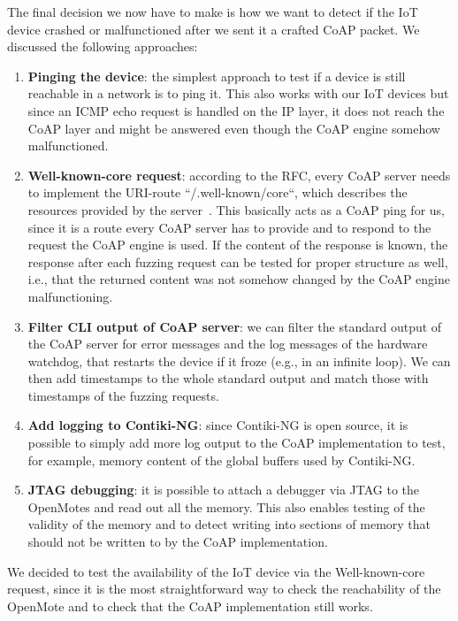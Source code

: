 The final decision we now have to make is how we want to detect if the IoT device crashed or malfunctioned after we sent it a crafted CoAP packet. We discussed the following approaches:
\begin{enumerate}
	\item \textbf{Pinging the device}: the simplest approach to test if a device is still reachable in a network is to ping it. This also works with our IoT devices but since an ICMP echo request is handled on the IP layer, it does not reach the CoAP layer and might be answered even though the CoAP engine somehow malfunctioned.
	\item \textbf{Well-known-core request}: according to the RFC, every CoAP server needs to implement the URI-route ``/.well-known/core``, which describes the resources provided by the server~\cite{RFC7252}. This basically acts as a CoAP ping for us, since it is a route every CoAP server has to provide and to respond to the request the CoAP engine is used. If the content of the response is known, the response after each fuzzing request can be tested for proper structure as well, i.e., that the returned content was not somehow changed by the CoAP engine malfunctioning.
	\item \textbf{Filter CLI output of CoAP server}: we can filter the standard output of the CoAP server for error messages and the log messages of the hardware watchdog, that restarts the device if it froze (e.g., in an infinite loop). We can then add timestamps to the whole standard output and match those with timestamps of the fuzzing requests.
	\item \textbf{Add logging to Contiki-NG}: since Contiki-NG is open source, it is possible to simply add more log output to the CoAP implementation to test, for example, memory content of the global buffers used by Contiki-NG.
	\item \textbf{JTAG debugging}: it is possible to attach a debugger via JTAG to the OpenMotes and read out all the memory. This also enables testing of the validity of the memory and to detect writing into sections of memory that should not be written to by the CoAP implementation.
\end{enumerate}

We decided to test the availability of the IoT device via the Well-known-core request, since it is the most straightforward way to check the reachability of the OpenMote and to check that the CoAP implementation still works.
